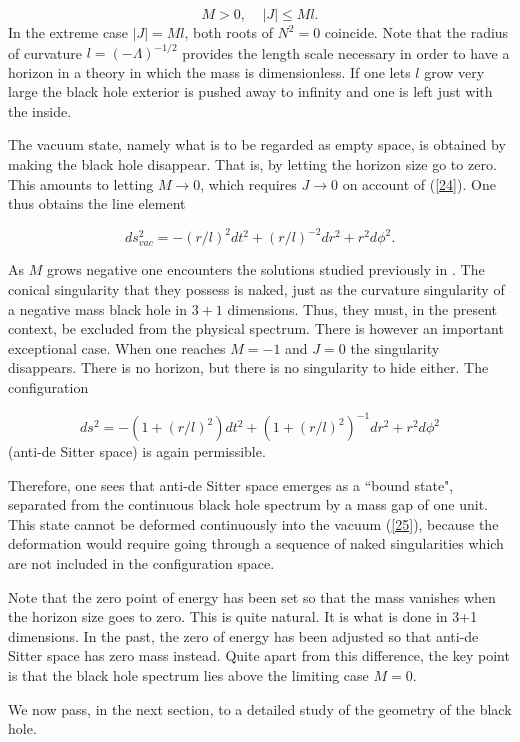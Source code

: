\documentclass[12pt]{article}
\newcounter{c1} \newcounter{c2}
\newcommand{\bb}{\begin{equation}}
\newcommand{\ee}{\end{equation}}
\begin{document}
\bb
    M>0,  \;\;\;\;  |J| \leq Ml.
\label{24}
\ee
%
In the extreme case $|J|=Ml$, both roots of $N^2=0$ coincide.
Note that the radius of curvature $l=(-\Lambda)^{-1/2}$ provides the
length scale necessary in order to have a horizon in a theory in which the
mass is dimensionless. If one lets $l$ grow very large the black hole
exterior is pushed away to infinity and one is left just with the inside.

The vacuum state, namely what is to be regarded as empty space, is
obtained by making the black hole disappear. That is, by letting
the horizon size go to zero. This amounts to letting
$M\rightarrow 0$, which requires $J\rightarrow 0$ on account of
(\ref{24}). One thus obtains the line element

\bb
ds^2_{vac} = -(r/l)^2 dt^2 + (r/l)^{-2} dr^2 + r^2 d\phi^2.
\label{25}
\ee

As $M$ grows negative one encounters the solutions studied
previously in \cite{7}. The conical singularity that
they possess is naked, just as the curvature singularity of a
negative mass black hole in $3+1$ dimensions.  Thus, they must,
in the present context, be excluded from the physical spectrum.
There is however an important exceptional case. When one reaches
$M=-1$ and $J=0$ the singularity disappears.  There is no
horizon, but there is no singularity to hide either.  The
configuration

\bb
 ds^2=-(1+(r/l)^2) dt^2 + (1+(r/l)^2)^{-1} dr^2 + r^2 d\phi^2
\label{26}
\ee
%
(anti-de Sitter space) is again permissible.

Therefore, one sees that anti-de Sitter space emerges as a ``bound state",
separated from the continuous black hole spectrum by a mass gap of one
unit. This state cannot be deformed continuously into the vacuum
(\ref{25}), because the deformation would require going through a sequence
of naked singularities which are not included in the configuration space.

Note that the zero point of energy has been set so that the mass vanishes
when the horizon size goes to zero. This is quite natural. It is what is
done in 3+1 dimensions. In the past, the zero of energy has been adjusted
so that anti-de Sitter space has zero mass instead. Quite apart from
this difference, the key point is that the black hole spectrum lies above
the limiting case $M=0$.

We now pass, in the next section, to a detailed study of the
geometry of the black hole.
\end{document}

